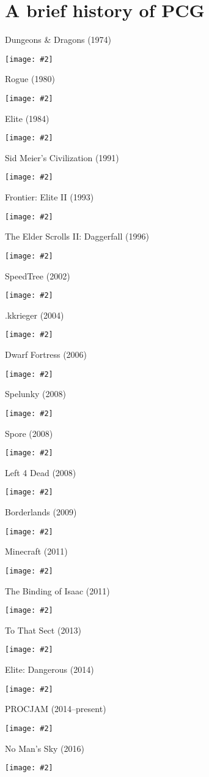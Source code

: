 \part{A brief history of PCG}
\frame{\partpage}

\newcommand{\pictureslideb}[3]{
	\begin{frame}{#1}
		\begin{center}
			#3
			
			\vspace{6pt}
			
			\texttt{[image: \#2]}
		\end{center}
	\end{frame}
}

\newcommand{\pictureslide}[2]{
	\begin{frame}{#1}
		\begin{center}
			\texttt{[image: \#2]}
		\end{center}
	\end{frame}
}

\newcommand{\pictureslidew}[2]{
	\begin{frame}{#1}
		\begin{center}
			\texttt{[image: \#2]}
		\end{center}
	\end{frame}
}

\pictureslide{Dungeons \& Dragons (1974)}{dnd}
\pictureslide{Rogue (1980)}{rogue}
\pictureslide{Elite (1984)}{elite}
\pictureslide{Sid Meier's Civilization (1991)}{civilization}
\pictureslide{Frontier: Elite II (1993)}{frontier}
\pictureslide{The Elder Scrolls II: Daggerfall (1996)}{daggerfall}
\pictureslide{SpeedTree (2002)}{speedtree}
\pictureslide{.kkrieger (2004)}{kkrieger}
\pictureslide{Dwarf Fortress (2006)}{dwarffortress}
\pictureslide{Spelunky (2008)}{spelunky}
\pictureslide{Spore (2008)}{spore}
\pictureslide{Left 4 Dead (2008)}{left4dead}
\pictureslide{Borderlands (2009)}{borderlands}
\pictureslide{Minecraft (2011)}{minecraft}
\pictureslide{The Binding of Isaac (2011)}{isaac}
\pictureslide{To That Sect (2013)}{tothatsect}
\pictureslide{Elite: Dangerous (2014)}{elitedangerous}
\pictureslidew{PROCJAM (2014--present)}{procjam}
\pictureslide{No Man's Sky (2016)}{nomanssky}
